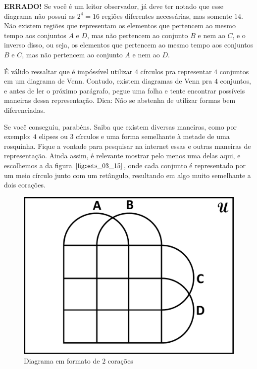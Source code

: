 \textbf{ERRADO!} Se você é um leitor observador, já deve ter notado que esse diagrama não possui as $2^4=16$ regiões diferentes necessárias, mas somente $14$. Não existem regiões que representam os elementos que pertencem ao mesmo tempo aos conjuntos $A$ e $D$, mas não pertencem ao conjunto $B$ e nem ao $C$, e o inverso disso, ou seja, os elementos que pertencem ao mesmo tempo aos conjuntos $B$ e $C$, mas não pertencem ao conjunto $A$ e nem ao $D$.

É válido ressaltar que é impóssível utilizar $4$ círculos pra representar $4$ conjuntos em um diagrama de Venn. Contudo, existem diagramas de Venn pra $4$ conjuntos, e antes de ler o próximo parágrafo, pegue uma folha e tente encontrar possíveis maneiras dessa representação. Dica: Não se abstenha de utilizar formas bem diferenciadas.

Se você conseguiu, parabéns. Saiba que existem diversas maneiras, como por exemplo: $4$ elipses ou $3$ círculos e uma forma semelhante à metade de uma rosquinha. Fique a vontade para pesquisar na internet essas e outras maneiras de representação. Ainda assim, é relevante mostrar pelo menos uma delas aqui, e escolhemos a da figura $\ref{fig:sets_03_15}$, onde cada conjunto é representado por um meio círculo junto com um retângulo, resultando em algo muito semelhante a dois corações.

\begin{figure}[h!]
  \centering
  \includegraphics[scale=0.3]{figures/sets/fig_sets_03_15.pdf}
  \caption{Diagrama em formato de $2$ corações}
  \label{fig:sets_03_15}
\end{figure}

